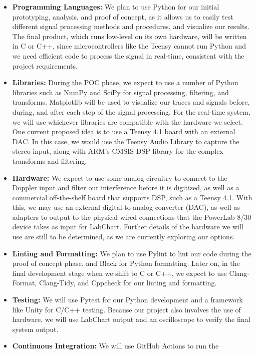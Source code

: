 \documentclass{article}
\begin{document}
\begin{itemize}
\item \textbf{Programming Languages:} We plan to use Python for our initial
  prototyping, analysis, and proof of concept, as it allows us to easily test
  different signal processing methods and procedures, and visualize our
  results. The final product, which runs low-level on its own hardware, will be
  written in C or C++, since microcontrollers like the Teensy cannot run Python
  and we need efficient code to process the signal in real-time, consistent
  with the project requirements.
\item \textbf{Libraries:} During the POC phase, we expect to use a number of
  Python libraries such as NumPy and SciPy for signal processing, filtering, and
  transforms. Matplotlib will be used to visualize our traces and signals
  before, during, and after each step of the signal processing. For the
  real-time system, we will use whichever libraries are compatible with the
  hardware we select. One current proposed idea is to use a Teensy 4.1 board
  with an external DAC. In this case, we would use the Teensy Audio Library to
  capture the stereo input, along with ARM's CMSIS-DSP library for the complex
  transforms and filtering.
\item \textbf{Hardware:} We expect to use some analog circuitry to connect to
  the Doppler input and filter out interference before it is digitized, as well
  as a commercial off-the-shelf board that supports DSP, such as a Teensy 4.1.
  With this, we may use an external digital-to-analog converter (DAC), as well
  as adapters to output to the physical wired connections that the PowerLab
  8/30 device takes as input for LabChart. Further details of the hardware we
  will use are still to be determined, as we are currently exploring our
  options.
\item \textbf{Linting and Formatting:} We plan to use Pylint to lint our code
  during the proof of concept phase, and Black for Python formatting. Later on,
  in the final development stage when we shift to C or C++, we expect to use
  Clang-Format, Clang-Tidy, and Cppcheck for our linting and formatting.
\item \textbf{Testing:} We will use Pytest for our Python development and a
  framework like Unity for C/C++ testing. Because our project also involves the
  use of hardware, we will use LabChart output and an oscilloscope to verify the
  final system output.
\item \textbf{Continuous Integration:} We will use GitHub Actions to run the

\end{itemize}
\end{document}
